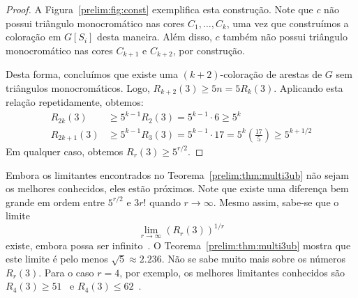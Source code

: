 \begin{proof}
A Figura~\ref{prelim:fig:const} exemplifica esta construção. Note que $c$ não possui triângulo monocromático nas cores $C_1, \dots, C_k$, uma vez que construímos a coloração em $G[S_i]$ desta maneira. Além disso, $c$ também não possui triângulo monocromático nas cores $C_{k+1}$ e $C_{k+2}$, por construção.

Desta forma, concluímos que existe uma $(k+2)$-coloração de arestas de $G$ sem triângulos monocromáticos. Logo, $R_{k+2}(3) \geq 5n = 5R_k(3)$. Aplicando esta relação repetidamente, obtemos:
\begin{align*}
R_{2k}(3) &\geq 5^{k-1}R_2(3) = 5^{k-1}\cdot6 \geq 5^{k}  \\
R_{2k+1}(3) &\geq 5^{k-1}R_3(3) = 5^{k-1}\cdot17 = 5^k \left(\frac{17}{5}\right) \geq 5^{k + 1/2}
\end{align*}
Em qualquer caso, obtemos $R_{r}(3) \geq 5^{r/2}$.
\end{proof}

Embora os limitantes encontrados no Teorema~\ref{prelim:thm:multi3ub} não sejam os melhores conhecidos, eles estão próximos. Note que existe uma diferença bem grande em ordem entre $5^{r/2}$ e $3r!$ quando $r \to \infty$. Mesmo assim, sabe-se que o  limite
\[ \lim_{r \to \infty} \left(R_r(3) \right)^{1/r} \]
existe, embora possa ser infinito~\cite{chung1983survey}. O Teorema~\ref{prelim:thm:multi3ub} mostra que este limite é pelo menos $\sqrt{5} \approx 2.236$.
Não se sabe muito mais sobre os números $R_r(3)$. Para o caso $r=4$, por exemplo, os melhores limitantes conhecidos são $R_4(3) \geq 51$~\cite{chung1973ramsey} e $R_4(3) \leq 62$~\cite{fettes2004upper}.



